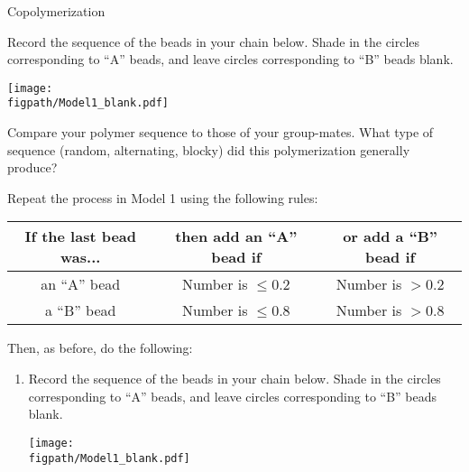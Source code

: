 \begin{activity}{Copolymerization}
\begin{model}
\end{model}


\begin{ctqs}

	\question \label{\labelbase:ctq:sim-random} Record the sequence of the beads in your chain below.  Shade in the circles corresponding to ``A'' beads, and leave circles corresponding to ``B'' beads blank.
	
		\vspace{6pt}
		\centerline{\texttt{[image: \\figpath/Model1\_blank.pdf]}}
	
	\question Compare your polymer sequence to those of your group-mates.  What type of sequence (random, alternating, blocky) did this polymerization generally produce?
		
		\begin{solution}[1in]\end{solution}
	
	\question \label{\labelbase:ctq:sim-alternating} Repeat the process in Model 1 using the following rules:	\begin{center}
					\renewcommand{\arraystretch}{1.5}
					\begin{tabular}{|c|c|c|}
						\hline
						\textbf{If the last bead was...} &  \textbf{then add an ``A'' bead if} & \textbf{or add a ``B'' bead if}\\\hline
						 an ``A'' bead & Number is $\leq 0.2$ & Number is $> 0.2$ \\\hline
						 a ``B'' bead & Number is $\leq 0.8$ & Number is $> 0.8$ \\\hline
					\end{tabular}
					\end{center}
	
		Then, as before, do the following:
		\begin{enumerate}
			\item Record the sequence of the beads in your chain below.  Shade in the circles corresponding to ``A'' beads, and leave circles corresponding to ``B'' beads blank.
	
		\vspace{6pt}
		\centerline{\texttt{[image: \\figpath/Model1\_blank.pdf]}}
	

\end{enumerate}
\end{ctqs}
\end{activity}
